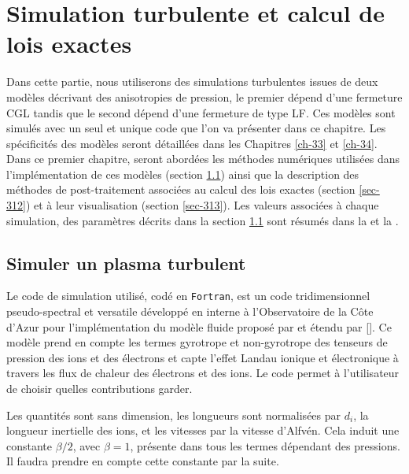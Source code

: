 \chapter{Simulation turbulente et calcul de lois exactes }
\renewcommand\partie{\Partie\ Chapitre \thechapter}
\label{ch-31}

\bigskip
\minitoc  

Dans cette partie, nous utiliserons des simulations turbulentes issues de deux modèles décrivant des anisotropies de pression, le premier dépend d'une fermeture \acs{CGL} tandis que le second dépend d'une fermeture de type \acs{LF}. Ces modèles sont simulés avec un seul et unique code que l'on va présenter dans ce chapitre. Les spécificités des modèles seront détaillées dans les Chapitres \ref{ch-33} et \ref{ch-34}. Dans ce premier chapitre, seront abordées les méthodes numériques utilisées dans l'implémentation de ces modèles (section \ref{sec-311}) ainsi que la description des méthodes de post-traitement associées au calcul des lois exactes (section \ref{sec-312}) et à leur visualisation (section \ref{sec-313}). Les valeurs associées à chaque simulation, des paramètres décrits dans la section \ref{sec-311} sont résumés dans la  et la .
 

\section{Simuler un plasma turbulent }
\label{sec-311}

Le code de simulation utilisé, codé en \verb|Fortran|, est un code tridimensionnel pseudo-spectral et versatile développé en interne à l'Observatoire de la Côte d'Azur pour l'implémentation du modèle fluide proposé par \cite{snyder_landau_1997} et étendu par [\cite{goswami_landau_2005,passot_collisionless_2007,passot_extending_2012,sulem_landau_2015}]. Ce modèle prend en compte les termes gyrotrope et non-gyrotrope des tenseurs de pression des ions et des électrons et capte l'effet Landau ionique et électronique à travers les flux de chaleur des électrons et des ions. Le code permet à l'utilisateur de choisir quelles contributions garder.

Les quantités sont sans dimension, les longueurs sont normalisées par $d_i$, la longueur inertielle des ions, et les vitesses par la vitesse d'Alfvén. Cela induit une constante $\beta/2$, avec $\beta = 1$, présente dans tous les termes dépendant des pressions. Il faudra prendre en compte cette constante par la suite. 

